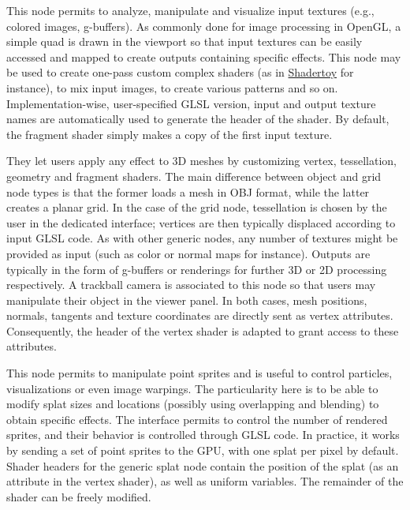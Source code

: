 
%
This node permits to analyze, manipulate and visualize input textures
(e.g., colored images, g-buffers).  As commonly done for image
processing in OpenGL, a simple quad is drawn in the viewport so that
input textures can be easily accessed and mapped to create outputs
containing specific effects.  This node may be used to create one-pass
custom complex shaders (as in
\href{https://www.shadertoy.com/}{Shadertoy} for instance), to mix
input images, to create various patterns and so on.
Implementation-wise, user-specified GLSL version, input and output
texture names are automatically used to generate the header of the
shader.  By default, the fragment shader simply makes a copy of the
first input texture.

\vspace{0.5cm}
They let users apply
any effect to 3D meshes by customizing vertex, tessellation, geometry
and fragment shaders.  The main difference between object and grid
node types is that the former loads a mesh in OBJ format, while the
latter creates a planar grid.  In the case of the grid node,
tessellation is chosen by the user in the dedicated interface;
vertices are then typically displaced according to input GLSL code.
As with other generic nodes, any number of textures might be provided
as input (such as color or normal maps for instance).  Outputs are
typically in the form of g-buffers or renderings for further 3D or 2D
processing respectively.  A trackball camera is associated to this
node so that users may manipulate their object in the viewer panel.
In both cases, mesh positions, normals, tangents and texture
coordinates are directly sent as vertex attributes.  Consequently, the
header of the vertex shader is adapted to grant access to these
attributes.

\vspace{0.5cm}
This node permits to manipulate point
sprites and is useful to control particles, visualizations or even
image warpings.  The particularity here is to be able to modify splat
sizes and locations (possibly using overlapping and blending) to
obtain specific effects.  The interface permits to control the number
of rendered sprites, and their behavior is controlled through GLSL
code.  In practice, it works by sending a set of point sprites to the
GPU, with one splat per pixel by default.  Shader headers for the
generic splat node contain the position of the splat (as an attribute
in the vertex shader), as well as uniform variables.  The remainder of
the shader can be freely modified.

